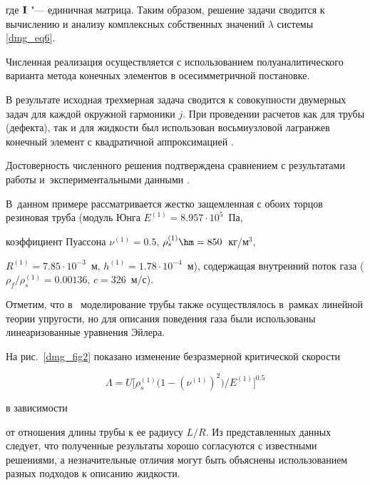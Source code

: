 где $\bf{I}$ "--- единичная матрица. Таким образом, решение задачи сводится к вычислению и анализу комплексных собственных значений $\lambda$  системы \eqref{dmg_eq6}.



Численная реализация осуществляется с использованием полуаналитического варианта метода конечных элементов \cite{26_Zienkiewicz} в осесимметричной постановке. 

В результате исходная трехмерная задача сводится к совокупности двумерных задач для каждой окружной гармоники $j$. При проведении расчетов как для трубы (дефекта), так и для жидкости был использован восьмиузловой лагранжев конечный элемент с квадратичной аппроксимацией \cite{26_Zienkiewicz}.





\smallskip








Достоверность численного решения подтверждена сравнением с результатами работы \cite{17_Zhang} и~экспериментальными данными \cite{27_Paidoussis}. 

В~данном примере рассматривается жестко защемленная с обоих торцов резиновая труба (модуль Юнга ${E^{(1)}} = 8.957 \cdot {10^5}$~Па, 

коэффициент Пуассона $\nu^{(1)} = 0.5$, $\rho _s^{(1)} \hm = 850$~кг/м$^3$, 

${R^{(1)}} = 7.85 \cdot {10^{ - 3}}$~м, ${h^{(1)}} = 1.78 \cdot {10^{ - 4}}$~м), содержащая внутренний поток газа (${\rho _f} / {\rho _s^{(1)}} = 0.00136$, $c = 326$~м/с). 

Отметим, что в~\cite{17_Zhang} моделирование трубы также осуществлялось в~рамках линейной теории упругости, но для описания поведения газа были использованы линеаризованные уравнения Эйлера.



На рис.~\ref{dmg_fig2} показано изменение безразмерной критической скорости 

$$

\Lambda  = U \bigl[ 

\rho _s^{(1)} \bigl( 1 - (\nu ^{(1)})^2 \bigr) / E^{(1)} 

\bigr]^{0.5}

$$  

в зависимости

от отношения длины трубы к ее радиусу $L/R$. Из представленных данных следует, что полученные результаты хорошо согласуются с известными решениями, а незначительные отличия могут быть объяснены использованием разных подходов к описанию жидкости.



